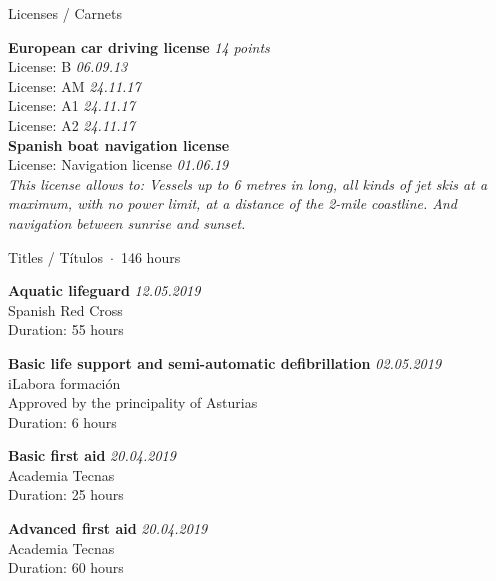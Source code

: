 \documentclass{resume} %
\begin{document}
\begin{rSection}{Licenses / Carnets}

{\bf European car driving license} \hfill {\em 14 points}\\ 
License: B \hfill {\em 06.09.13} \\
License: AM \hfill {\em 24.11.17} \\
License: A1 \hfill {\em 24.11.17} \\
License: A2 \hfill {\em 24.11.17} \\

{\bf Spanish boat navigation license} \\ 
License: Navigation license \hfill {\em 01.06.19} \\
{\it This license allows to: Vessels up to 6 metres in long, all kinds of jet skis at a maximum, with no power limit, at a distance of the 2-mile coastline. And navigation between sunrise and sunset.}

\end{rSection}


\begin{rSection}{Titles / Títulos~$\cdot$~146 hours}

{\bf  Aquatic lifeguard} \hfill {\em 12.05.2019} \\ 
Spanish Red Cross \\
Duration: 55 hours

{\bf  Basic life support and semi-automatic defibrillation} \hfill {\em 02.05.2019} \\ 
iLabora formación \\
Approved by the principality of Asturias \\
Duration: 6 hours

{\bf  Basic first aid} \hfill {\em 20.04.2019} \\ 
Academia Tecnas \\
Duration: 25 hours

{\bf  Advanced first aid} \hfill {\em 20.04.2019} \\ 
Academia Tecnas \\
Duration: 60 hours

\end{rSection}

\end{document}
